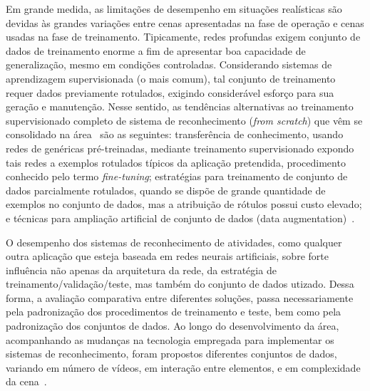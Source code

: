 Em grande medida, as limitações de desempenho em situações realísticas são devidas às grandes variações entre cenas apresentadas na fase de operação e cenas usadas na fase de treinamento. Tipicamente, redes profundas exigem  conjunto de dados de treinamento enorme a fim de apresentar boa capacidade de generalização, mesmo em condições controladas. Considerando sistemas de aprendizagem supervisionada (o mais comum), tal conjunto de treinamento requer dados previamente rotulados, exigindo considerável esforço para sua geração e manutenção. Nesse sentido, as tendências alternativas ao treinamento supervisionado completo de sistema de reconhecimento (\emph{from scratch}) que vêm se consolidado na área~\parencite{herath-2017} são as seguintes: transferência de conhecimento, usando redes de genéricas pré-treinadas, mediante treinamento supervisionado expondo tais redes a exemplos rotulados típicos da aplicação pretendida, procedimento conhecido pelo termo \emph{fine-tuning}; estratégias para treinamento de conjunto de dados parcialmente rotulados, quando se dispõe de grande quantidade de exemplos no conjunto de dados, mas a atribuição de rótulos possui custo elevado; e técnicas para ampliação artificial de conjunto de dados (data augmentation)~\parencite{wang-2015}.

O desempenho dos sistemas de reconhecimento de atividades, como qualquer outra aplicação que esteja baseada em redes neurais artificiais, sobre forte influência não apenas da arquitetura da rede, da estratégia de treinamento/validação/teste, mas também do conjunto de dados utizado. Dessa forma, a avaliação comparativa entre diferentes soluções, passa necessariamente pela padronização dos procedimentos de treinamento e teste, bem como pela padronização dos conjuntos de dados.  Ao longo do desenvolvimento da área, acompanhando as mudanças na tecnologia empregada para implementar os sistemas de reconhecimento, foram propostos diferentes conjuntos de dados, variando em número de vídeos, em interação entre elementos, e em complexidade da cena~\parencite{jegham-2020, kongr-2018}. 

